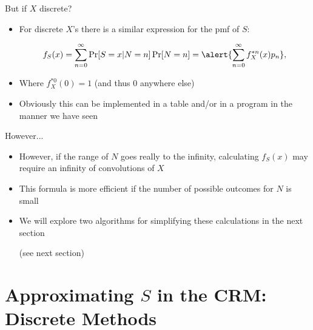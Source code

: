 \documentclass[11pt]{beamer}
\begin{document}
\begin{frame}{But if $X$ discrete?}

\begin{itemize}

\item For discrete $X$'s there is a similar expression for the pmf of $S$:

$$f_S(x)=\sum_{n=0}^\infty \Pr[S= x|N=n]\Pr[N=n]=\alert{\sum_{n=0}^\infty f^{*n}_X(x)p_n},$$

\vfill

\item Where $f^{*0}_X(0)=1$ (and thus 0 anywhere else)

\vfill

\item Obviously this can be implemented in a table and/or in a program in the manner we have seen

\end{itemize}

\end{frame}
\begin{frame}{However...}

\begin{itemize}
\item However, if the range of $N$ goes really to the infinity, calculating $f_S(x)$ may require an infinity of convolutions of $X$

\vfill

\item This formula is more efficient if the number of possible outcomes for $N$ is small

\vfill

\item We will explore two algorithms for simplifying these calculations in the next section

 (see next section)
\end{itemize}
\end{frame}
\section{Approximating $S$ in the CRM: Discrete Methods}
\end{document}
